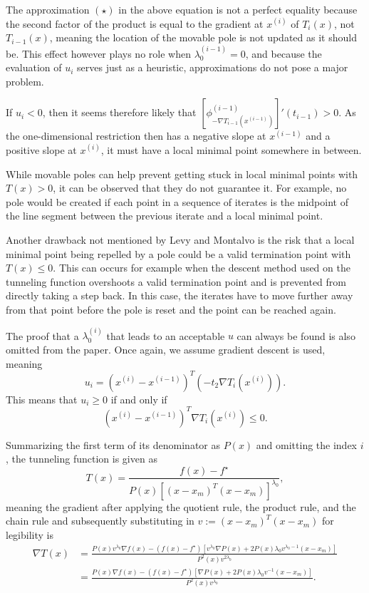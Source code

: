 \documentclass[a4paper,12pt,twoside]{article}
\begin{document}
The approximation $(\star)$ in the above equation is not a perfect equality because the second factor of the product is equal to the gradient at $x^{(i)}$ of $T_i(x)$, not $T_{i-1}(x)$, meaning the location of the movable pole is not updated as it should be. This effect however plays no role when $\lambda_0^{(i-1)}=0$, and because the evaluation of $u_i$ serves just as a heuristic, approximations do not pose a major problem.

If $u_{i} < 0$, then it seems therefore likely that $[\phi^{(i-1)}_{-\nabla T_{i-1}(x^{(i-1)})}]'(t_{i-1}) > 0$. As the one-dimensional restriction then has a negative slope at $x^{(i-1)}$ and a positive slope at $x^{(i)}$, it must have a local minimal point somewhere in between. 

While movable poles can help prevent getting stuck in local minimal points with $T(x) > 0$, it can be observed that they do not guarantee it. For example, no pole would be created if each point in a sequence of iterates is the midpoint of the line segment between the previous iterate and a local minimal point. 

Another drawback not mentioned by Levy and Montalvo is the risk that a local minimal point being repelled by a pole could be a valid termination point with $T(x) \leq 0$. This can occurs for example when the descent method used on the tunneling function overshoots a valid termination point and is prevented from directly taking a step back. In this case, the iterates have to move further away from that point before the pole is reset and the point can be reached again.

The proof that a $\lambda_0^{(i)}$ that leads to an acceptable $u$ can always be found is also omitted from the paper. Once again, we assume gradient descent is used, meaning 
\[
u_i = (x^{(i)} - x^{(i-1)})^T (-t_2 \nabla T_i(x^{(i)})) .
\]
This means that $u_i \geq 0$ if and only if
\begin{equation}
    \label{eq:ucondition}
    (x^{(i)} - x^{(i-1)})^T \nabla T_i(x^{(i)}) \leq 0.
\end{equation}

Summarizing the first term of its denominator as $P(x)$ and omitting the index $i$, the tunneling function is given as 
\[
T(x) = \frac{f(x) - f^\star}{P(x) [(x-x_m)^T(x-x_m)]^{\lambda_0}},
\]
meaning the gradient after applying the quotient rule, the product rule, and the chain rule and subsequently substituting in $v := (x-x_m)^T(x-x_m)$ for legibility is 
\begin{align*}
    \nabla T(x) &= \frac{P(x) v^{\lambda_0} \nabla f(x) 
    - (f(x) - f^\star)  
    [v^{\lambda_0} \nabla P(x)  + 2P(x) \lambda_0v^{\lambda_0 - 1} (x-x_m) ]  }
    {P^2(x) v^{2\lambda_0}}    \\
    &= \frac{P(x) \nabla f(x) 
    - (f(x) - f^\star)  [ \nabla P(x)  + 2 P(x) \lambda_0 v^{- 1} (x-x_m) ]  }
    {P^2(x) v^{\lambda_0}}.
\end{align*}
\end{document}
